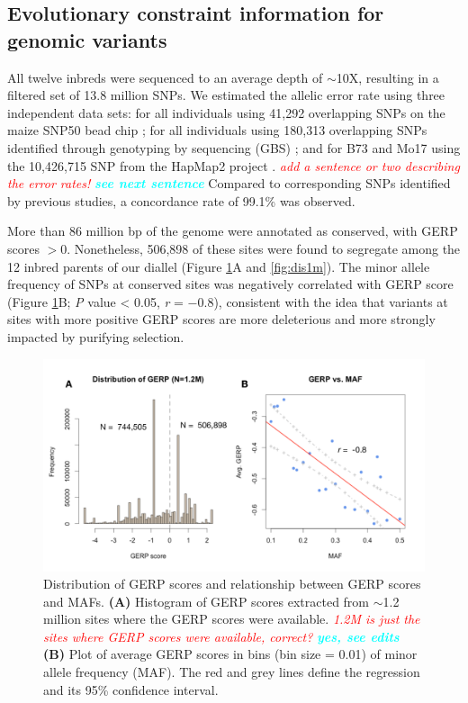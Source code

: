 \documentclass[9pt,twocolumn,twoside]{gsajnl}
\newcommand{\yang}[1]{\textcolor{cyan}{\emph{\bf  #1}} }
\newcommand{\jri}[1]{\textcolor{red}{ \emph{ #1}} }
\begin{document}
\subsection*{Evolutionary constraint information for genomic variants}

All twelve inbreds were sequenced to an average depth of $\sim$10X, resulting in a filtered set of 13.8 million SNPs. 
We estimated the allelic error rate using three independent data sets: for all individuals using 41,292 overlapping SNPs on the maize SNP50 bead chip \citep{Heerwaarden2012}; for all individuals using 180,313 overlapping SNPs identified through genotyping by sequencing (GBS) \citep{Romay2013}; and for B73 and Mo17 using the 10,426,715 SNP from the HapMap2 project \citep{Chia2012}. \jri{add a sentence or two describing the error rates!} \yang{see next sentence} Compared to corresponding SNPs identified by previous studies, a concordance rate of 99.1\% was observed.

More than 86 million bp of the genome were annotated as conserved, with GERP scores $>0$.
Nonetheless, 506,898 of these sites were found to segregate among the 12 inbred parents of our diallel (Figure \ref{fig:gerpmaf}A and \ref{fig:dis1m}).
The minor allele frequency of SNPs at conserved sites was negatively correlated with GERP score (Figure \ref{fig:gerpmaf}B; \emph{P} value < 0.05, \emph{r} = $-0.8$), consistent with the idea that variants at sites with more positive GERP scores are more deleterious and more strongly impacted by purifying selection.

\begin{figure}[htbp]
\centering
\includegraphics[width=\linewidth]{Figure_gerpmaf.pdf}
\caption{Distribution of GERP scores and relationship between GERP scores and MAFs. \textbf{(A)} Histogram of GERP scores extracted from $\sim$1.2 million sites where the GERP scores were available. \jri{1.2M is just the sites where GERP scores were available, correct?} \yang{yes, see edits} \textbf{(B)} Plot of average GERP scores in bins (bin size = 0.01) of minor allele frequency (MAF). The red and grey lines define the regression and its 95\% confidence interval.}
\label{fig:gerpmaf}
\end{figure}
\end{document}
